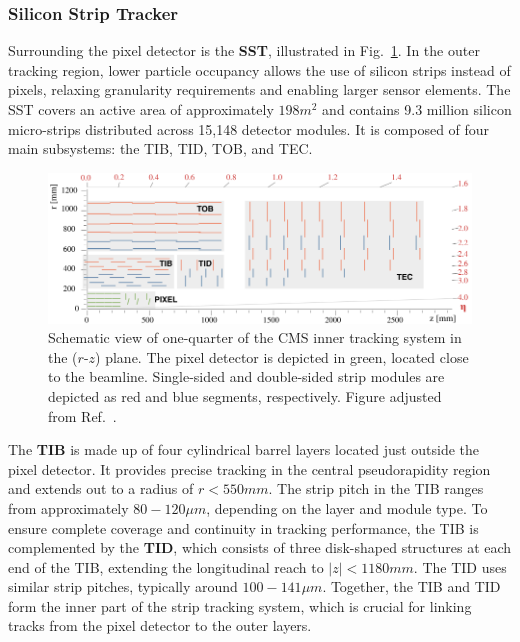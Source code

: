 \subsubsection{Silicon Strip Tracker}
Surrounding the pixel detector is the \textbf{\ac{SST}}, illustrated in Fig.~\ref{Figure:Chapter3_Tracker_Geometry}. In the outer tracking region, lower particle occupancy allows the use of silicon strips instead of pixels, relaxing granularity requirements and enabling larger sensor elements. The \ac{SST} covers an active area of approximately $198\unit{m}^2$ and contains 9.3 million silicon micro-strips distributed across 15,148 detector modules. It is composed of four main subsystems: the \ac{TIB}, \ac{TID}, \ac{TOB}, and \ac{TEC}.

\begin{figure}[!htbp]
\centering
\includegraphics[width=1\textwidth]{Figures/Chapter3/Phase1_Tracker.pdf}
\caption[Schematic of CMS inner tracking system in the ($r$-$z$) plane]{Schematic view of one-quarter of the \ac{CMS} inner tracking system in the ($r$-$z$) plane. The pixel detector is depicted in green, located close to the beamline. Single-sided and double-sided strip modules are depicted as red and blue segments, respectively. Figure adjusted from Ref.~\cite{CMS_Detector_Run3}.}
\label{Figure:Chapter3_Tracker_Geometry}
\end{figure}

The \textbf{\ac{TIB}} is made up of four cylindrical barrel layers located just outside the pixel detector. It provides precise tracking in the central pseudorapidity region and extends out to a radius of $r < 550\unit{mm}$. The strip pitch in the \ac{TIB} ranges from approximately $80-120\unit{\mu m}$, depending on the layer and module type. To ensure complete coverage and continuity in tracking performance, the \ac{TIB} is complemented by the \textbf{\ac{TID}}, which consists of three disk-shaped structures at each end of the \ac{TIB}, extending the longitudinal reach to $|z| < 1180\unit{mm}$. The \ac{TID} uses similar strip pitches, typically around $100-141\unit{\mu m}$. Together, the \ac{TIB} and \ac{TID} form the inner part of the strip tracking system, which is crucial for linking tracks from the pixel detector to the outer layers.

